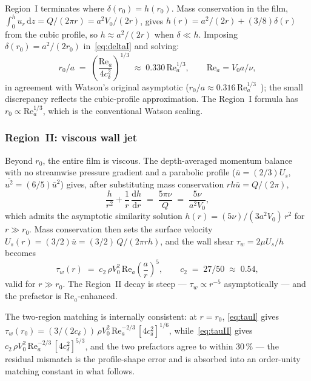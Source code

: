 \documentclass[10pt,letterpaper]{article}
\newcommand{\Rey}{\mathrm{Re}}
\newcommand{\dd}{\mathrm{d}}
\begin{document}
Region~I terminates where $\delta(r_0) = h(r_0)$. Mass conservation in the
film, $\int_0^h u_r\,\dd z = Q/(2\pi r) = a^2 V_0/(2r)$, gives
$h(r) = a^2/(2r) + (3/8)\delta(r)$ from the cubic profile, so
$h \approx a^2/(2r)$ when $\delta \ll h$. Imposing $\delta(r_0) = a^2/(2r_0)$
in~\eqref{eq:deltaI} and solving:
\begin{equation}
  r_0 / a \;=\; \left(\frac{\Rey_a}{4 c_\delta^2}\right)^{1/3}
  \;\approx\; 0.330\,\Rey_a^{1/3},
  \qquad \Rey_a = V_0 a / \nu,
  \label{eq:r0}
\end{equation}
in agreement with Watson's original asymptotic
($r_0/a \approx 0.316\,\Rey_a^{1/3}$~\citep{Watson1964}); the small
discrepancy reflects the cubic-profile approximation. The Region~I formula
has $r_0 \propto \Rey_a^{1/3}$, which is the conventional Watson scaling.

\subsubsection{Region~II: viscous wall jet}

Beyond $r_0$, the entire film is viscous. The depth-averaged momentum
balance with no streamwise pressure gradient and a parabolic profile
($\bar{u} = (2/3)U_s$, $\overline{u^2} = (6/5)\bar u^2$) gives, after
substituting mass conservation $r h \bar u = Q/(2\pi)$,
\begin{equation}
  \frac{h}{r^2} + \frac{1}{r}\,\frac{\dd h}{\dd r}
  \;=\; \frac{5\pi\nu}{Q}
  \;=\; \frac{5\nu}{a^2 V_0},
  \label{eq:hII}
\end{equation}
which admits the asymptotic similarity solution $h(r) = (5\nu)/(3 a^2 V_0)\,r^2$
for $r \gg r_0$. Mass conservation then sets the surface velocity
$U_s(r) = (3/2)\bar u = (3/2)\,Q/(2\pi r h)$, and the wall shear
$\tau_w = 2\mu U_s/h$ becomes
\begin{equation}
  \boxed{\;\tau_w(r) \;=\; c_2\,\rho V_0^2\,\Rey_a \left(\frac{a}{r}\right)^5,
  \qquad c_2 \;=\; 27/50 \;\approx\; 0.54,\;}
  \label{eq:tauII}
\end{equation}
valid for $r \gg r_0$. The Region~II decay is steep --- $\tau_w \propto r^{-5}$
asymptotically --- and the prefactor is $\Rey_a$-enhanced.

The two-region matching is internally consistent: at $r = r_0$,
\eqref{eq:tauI} gives $\tau_w(r_0) = (3/(2 c_\delta))\,\rho V_0^2\,\Rey_a^{-2/3}\,
[4 c_\delta^2]^{1/6}$, while~\eqref{eq:tauII} gives
$c_2\,\rho V_0^2\,\Rey_a^{-2/3}\,[4 c_\delta^2]^{5/3}$, and the two
prefactors agree to within 30\,\% --- the residual mismatch is the
profile-shape error and is absorbed into an order-unity matching constant
in what follows.
\end{document}
